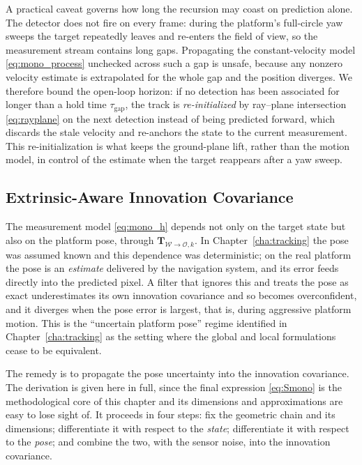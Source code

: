 A practical caveat governs how long the recursion may coast on prediction alone.
The detector does not fire on every frame: during the platform's full-circle yaw
sweeps the target repeatedly leaves and re-enters the field of view, so the
measurement stream contains long gaps. Propagating the constant-velocity model
\eqref{eq:mono_process} unchecked across such a gap is unsafe, because any
nonzero velocity estimate is extrapolated for the whole gap and the position
diverges. We therefore bound the open-loop horizon: if no detection has been
associated for longer than a hold time $\tau_{\mathrm{gap}}$, the track is
\emph{re-initialized} by ray--plane intersection \eqref{eq:rayplane} on the next
detection instead of being predicted forward, which discards the stale velocity
and re-anchors the state to the current measurement. This re-initialization is
what keeps the ground-plane lift, rather than the motion model, in control of the
estimate when the target reappears after a yaw sweep.

\subsection{Extrinsic-Aware Innovation Covariance}
\label{sec:mono_extrinsic}

The measurement model \eqref{eq:mono_h} depends not only on the target state but
also on the platform pose, through $\bm{T}_{\mathcal{W}\to\mathcal{O},k}$. In
Chapter~\ref{cha:tracking} the pose was assumed known and this dependence was
deterministic; on the real platform the pose is an \emph{estimate} delivered by
the navigation system, and its error feeds directly into the predicted pixel. A
filter that ignores this and treats the pose as exact underestimates its own
innovation covariance and so becomes overconfident, and it diverges when the pose
error is largest, that is, during aggressive platform motion. This is the
``uncertain platform pose'' regime identified in Chapter~\ref{cha:tracking} as
the setting where the global and local formulations cease to be equivalent.

The remedy is to propagate the pose uncertainty into the innovation covariance.
The derivation is given here in full, since the final expression
\eqref{eq:Smono} is the methodological core of this chapter and its dimensions
and approximations are easy to lose sight of. It proceeds in four steps: fix the
geometric chain and its dimensions; differentiate it with respect to the
\emph{state}; differentiate it with respect to the \emph{pose}; and combine the
two, with the sensor noise, into the innovation covariance.

